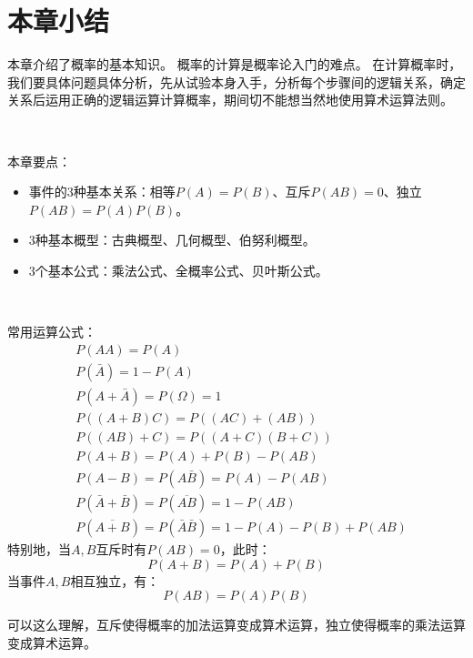 \section{本章小结}

本章介绍了概率的基本知识。
概率的计算是概率论入门的难点。
在计算概率时，我们要具体问题具体分析，先从试验本身入手，分析每个步骤间的逻辑关系，确定关系后运用正确的逻辑运算计算概率，期间切不能想当然地使用算术运算法则。

~

本章要点：
\begin{itemize}
    \item 事件的3种基本关系：相等$P\left( A \right) =P\left( B \right) $、互斥$P\left( AB \right) =0$、独立$P\left( AB \right) =P\left( A \right) P\left( B \right) $。
    \item 3种基本概型：古典概型、几何概型、伯努利概型。
    \item 3个基本公式：乘法公式、全概率公式、贝叶斯公式。
\end{itemize}

~

常用运算公式：
\begin{align*}
&P\left( AA \right) =P\left( A \right) \\
&P\left( \bar{A} \right) =1-P\left( A \right) \\
&P\left( A+\bar{A} \right) =P\left( \varOmega \right) =1 \\
&P\left( \left( A+B \right) C \right) =P\left( \left( AC \right) +\left( AB \right) \right) \\
&P\left( \left( AB \right) +C \right) =P\left( \left( A+C \right) \left( B+C \right) \right) \\
&P\left( A+B \right) =P\left( A \right) +P\left( B \right) -P\left( AB \right) \\
&P\left( A-B \right) =P\left( A\bar{B} \right) =P\left( A \right) -P\left( AB \right) \\
&P\left( \bar{A}+\bar{B} \right) =P\left( \overline{AB} \right) =1-P\left( AB \right) \\
&P\left( \overline{A+B} \right) =P\left( \bar{A}\bar{B} \right) =1-P\left( A \right) -P\left( B \right) +P\left( AB \right)
\end{align*}
特别地，当$A,B$互斥时有$P\left( AB \right) =0$，此时：
\[
P\left( A+B \right) =P\left( A \right) +P\left( B \right)
\]
当事件$A,B$相互独立，有：
\[
P\left( AB \right) =P\left( A \right) P\left( B \right)
\]

\begin{tcolorbox}
可以这么理解，互斥使得概率的加法运算变成算术运算，独立使得概率的乘法运算变成算术运算。
\end{tcolorbox}

